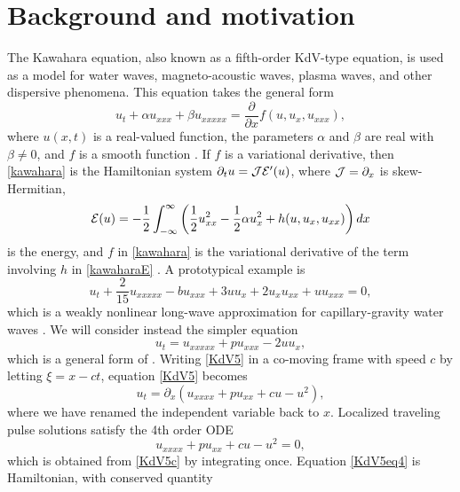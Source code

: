 \documentclass[10pt,reqno]{amsart}
\theoremstyle{plain}
\theoremstyle{definition}
\theoremstyle{remark}
\numberwithin{theorem}{section}
\numberwithin{equation}{section}
\begin{document}
\section{Background and motivation}\label{sec:KdV5}

The Kawahara equation, also known as a fifth-order KdV-type equation, is used as a model for water waves, magneto-acoustic waves, plasma waves, and other dispersive phenomena. This equation takes the general form
\begin{equation}\label{kawahara}
u_t + \alpha u_{xxx} + \beta u_{xxxxx} = \frac{\partial}{\partial x} f(u, u_x, u_{xxx}),
\end{equation}
where $u(x, t)$ is a real-valued function, the parameters $\alpha$ and $\beta$ are real with $\beta \neq 0$, and $f$ is a smooth function \cite{Bridges2002,Bridges2002a}. If $f$ is a variational derivative, then \cref{kawahara} is the Hamiltonian system $\partial_t u = \mathcal{J} \mathcal{E}'(u)$, where $\mathcal{J} = \partial_x$ is skew-Hermitian,
\begin{equation}\label{kawaharaE}
\mathcal{E}(u) = -\frac{1}{2}\int_{-\infty}^\infty 
\left( \frac{1}{2}u_{xx}^2 - \frac{1}{2}\alpha u_x^2 + h(u, u_x, u_{xx})\right)dx
\end{equation}
is the energy, and $f$ in \cref{kawahara} is the variational derivative of the term involving $h$ in \cref{kawaharaE} \cite{Bridges2002}. A prototypical example is
\[
u_t + \frac{2}{15}u_{xxxxx} - b u_{xxx} + 3 u u_x + 2 u_x u_{xx} + u u_{xxx} = 0,
\]
which is a weakly nonlinear long-wave approximation for capillary-gravity water waves \cite{Champneys1998,Champneys1997}. We will consider instead the simpler equation 
\begin{equation}\label{KdV5}
u_t = u_{xxxxx} + p u_{xxx} - 2 u u_x,
\end{equation}
which is a general form of \cite[(1)]{Pelinovsky2007}. Writing \cref{KdV5} in a co-moving frame with speed $c$ by letting $\xi = x - ct$, equation \cref{KdV5} becomes
\begin{equation}\label{KdV5c}
u_t = \partial_x(u_{xxxx} + p u_{xx} + cu - u^2),
\end{equation}
where we have renamed the independent variable back to $x$. Localized traveling pulse solutions satisfy the 4th order ODE
\begin{equation}\label{KdV5eq4}
u_{xxxx} + p u_{xx} + c u - u^2 = 0,
\end{equation}
which is obtained from \cref{KdV5c} by integrating once. Equation \cref{KdV5eq4} is Hamiltonian, with conserved quantity
\end{document}
